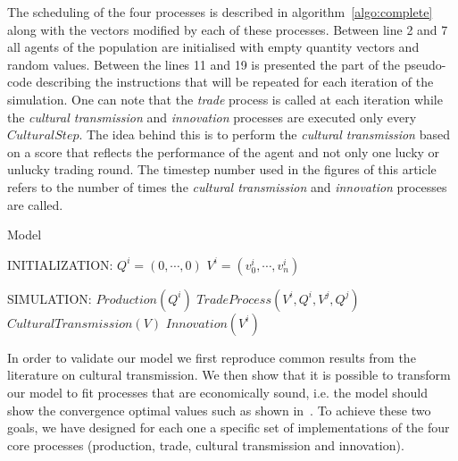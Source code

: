 \documentclass{wscpaperproc}
\begin{document}
The scheduling of the four processes is described in algorithm~\ref{algo:complete} along with the vectors modified by each of these processes. Between line 2 and 7 all agents of the population are initialised with empty quantity vectors and random values. Between the lines 11 and 19 is presented the part of the pseudo-code describing the instructions that will be repeated for each iteration of the simulation. One can note that the \emph{trade} process is called at each iteration while the \emph{cultural transmission} and \emph{innovation} processes are executed only every $CulturalStep$. The idea behind this is to perform the \emph{cultural transmission} based on a score that reflects the performance of the agent and not only one lucky or unlucky trading round. The timestep number used in the figures of this article refers to the number of times the \emph{cultural transmission} and \emph{innovation} processes are called.

\begin{algorithm}
\caption{Model}
\label{algo:complete}
	\begin{algorithmic}[1]
	\scriptsize
	\State INITIALIZATION: 
			 
				\State $Q^i = (0, \cdots, 0)$
				\State $V^i = (v^i_0, \cdots, v^i_n)$ 
			\EndFor
		\EndFor

	\State SIMULATION:
				\State $Production(Q^i)$
					\State $TradeProcess(V^i,Q^i,V^j,Q^j)$
				\EndFor				
					\State $CulturalTransmission(V)$
					\State $Innovation(V^i)$
				\EndIf
			\EndFor
		\EndLoop
\end{algorithmic}
\end{algorithm}


In order to validate our model we first reproduce common results from the literature on cultural transmission. We then show that it is possible to transform our model to fit processes that are economically sound, i.e. the model should show the convergence optimal values such as shown in~\cite{gintis_emergence_2006}. To achieve these two goals, we have designed for each one a specific set of implementations of the four core processes (production, trade, cultural transmission and innovation). 
\end{document}
